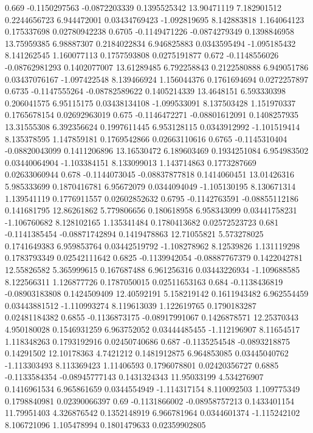 {0.669 -0.1150297563 -0.0872203339 0.1395525342 13.90471119 7.182901512 0.2244656723 6.944472001 0.03434769423 -1.092819695 8.142883818 1.164064123 0.175337698 0.02780942238
0.6705 -0.1149471226 -0.0874279349 0.1398846958 13.75959385 6.98887307 0.2184022834 6.946825883 0.0343595494 -1.095185432 8.141262545 1.160077113 0.1757593808 0.0275191877
0.672 -0.1148556026 -0.08762981293 0.1402077007 13.61289485 6.792258843 0.2122580888 6.949051786 0.03437076167 -1.097422548 8.139466924 1.156044376 0.1761694694 0.0272257897
0.6735 -0.1147555264 -0.08782589622 0.1405214339 13.4648151 6.593330398 0.206041575 6.95115175 0.03438134108 -1.099533091 8.137503428 1.151970337 0.1765678154 0.02692963019
0.675 -0.1146472271 -0.08801612091 0.1408257935 13.31555308 6.392356624 0.1997611445 6.953128115 0.0343912992 -1.101519414 8.135378595 1.147859181 0.1769542866 0.02663110616
0.6765 -0.1145310404 -0.08820043099 0.1411206896 13.16530472 6.189603469 0.1934251084 6.954983502 0.03440064904 -1.103384151 8.133099013 1.143714863 0.1773287669 0.02633060944
0.678 -0.1144073045 -0.08837877818 0.1414060451 13.01426316 5.985333699 0.1870416781 6.95672079 0.0344094049 -1.105130195 8.130671314 1.139541119 0.1776911557 0.02602852632
0.6795 -0.1142763591 -0.08855112186 0.141681795 12.86261862 5.779806656 0.180618958 6.958343099 0.03441758231 -1.106760682 8.128102165 1.135341484 0.1780413682 0.02572523723
0.681 -0.1141385454 -0.08871742894 0.1419478863 12.71055821 5.573278025 0.1741649383 6.959853764 0.03442519792 -1.108278962 8.12539826 1.131119298 0.1783793349 0.02542111642
0.6825 -0.1139942054 -0.08887767379 0.1422042781 12.55826582 5.365999615 0.167687488 6.961256316 0.03443226934 -1.109688585 8.122566311 1.126877726 0.1787050015 0.02511653163
0.684 -0.1138436819 -0.08903183808 0.1424509409 12.40592191 5.158219142 0.1611943482 6.962554459 0.03443881512 -1.110993274 8.119613039 1.122619765 0.1790183287 0.02481184382
0.6855 -0.1136873175 -0.08917991067 0.1426878571 12.25370343 4.950180028 0.1546931259 6.963752052 0.03444485455 -1.112196907 8.11654517 1.118348263 0.1793192916 0.02450740686
0.687 -0.1135254548 -0.0893218875 0.14291502 12.10178363 4.7421212 0.1481912875 6.964853085 0.03445040762 -1.113303493 8.113369423 1.11406593 0.1796078801 0.02420356727
0.6885 -0.1133584354 -0.08945777143 0.1431324343 11.95033199 4.534276907 0.1416961534 6.965861659 0.0344554949 -1.114317154 8.110092503 1.109775349 0.1798840981 0.02390066397
0.69 -0.1131866002 -0.08958757213 0.1433401154 11.79951403 4.326876542 0.1352148919 6.966781964 0.0344601374 -1.115242102 8.106721096 1.105478994 0.1801479633 0.02359902805
}
